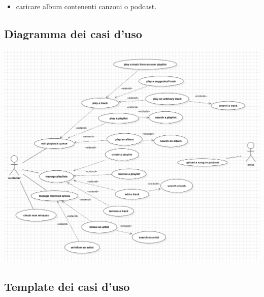 \documentclass{article}
\begin{document}
\begin{itemize}
\item
  caricare album contenenti canzoni o podcast.
\end{itemize}

\subsection{Diagramma dei casi d'uso}
\includegraphics[scale=0.33]{usecase04}

\subsection{Template dei casi d'uso}
\end{document}
